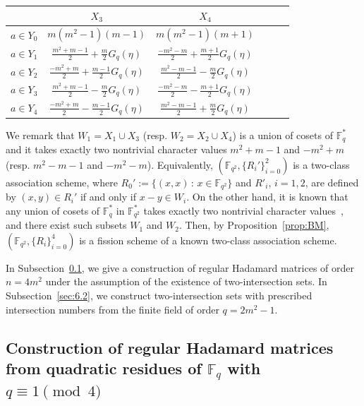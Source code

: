 \documentclass[ALCO,ThmDefs,Unicode]{cedram}
\newcommand*\F{{\mathbb F}}
\begin{document}
\begin{theo}
\begin{table}[!h]
\begin{center}
\begin{tabular}{|c||c|c|c|c|c|}
\end{tabular}\vspace{0.5em}
\begin{tabular}{|c||c|c|c|c|c|}\hline
&$X_3$&$X_4$\\ \hline \hline $a\in Y_0$& $m(m^2-1)(m-1)$ & $m(m^2-1)(m+1)$\\\hline $a\in Y_{1}$& $\frac{m^2+m-1}{2}+\frac{m}{2}G_q(\eta)$ & $\frac{-m^2-m}{2}+\frac{m+1}{2}G_q(\eta)$\\\hline $a\in Y_2$& $\frac{-m^2+m}{2}+\frac{m-1}{2}G_q(\eta)$& $\frac{m^2-m-1}{2}-\frac{m}{2}G_q(\eta)$\\\hline $a\in Y_{3}$& $\frac{m^2+m-1}{2}-\frac{m}{2}G_q(\eta)$ & $\frac{-m^2-m}{2}-\frac{m+1}{2}G_q(\eta)$\\\hline $a\in Y_4$& $\frac{-m^2+m}{2}-\frac{m-1}{2}G_q(\eta)$ & $\frac{m^2-m-1}{2}+\frac{m}{2}G_q(\eta)$\\\hline
\end{tabular}
\end{center}
\end{table}
\end{theo}

\begin{rema}
We remark that $W_1=X_1\cup X_3$ (resp. $W_2=X_2\cup X_4$) is a union of cosets of $\F_{q}^\ast$ and it takes exactly two nontrivial character values $m^2+m-1$ and $-m^2+m$ (resp. $m^2-m-1$ and $-m^2-m$). Equivalently, $(\F_{q^2},\{R_i'\}_{i=0}^2)$ is a two-class association scheme, where $R_0':=\{(x,x)\,:\,x\in \F_{q^2}\}$ and $R'_i$, $i=1,2$, are defined by $(x,y)\in R_{i}'$ if and only if $x-y\in W_i$. On the other hand, it is known that any union of cosets of $\F_{q}^\ast$ in $\F_{q^2}^\ast$ takes exactly two nontrivial character values~\cite[Theorem~2]{BWX}, and there exist such subsets $W_1$ and $W_2$. Then, by Proposition~\ref{prop:BM}, $(\F_{q^2},\{R_i\}_{i=0}^4)$ is a fission scheme of a known two-class association scheme.
\end{rema}

In Subsection~\ref{sec:6.1}, we give a construction of regular Hadamard matrices of order $n=4m^2$ under the assumption of the existence of two-intersection sets. In Subsection~\ref{sec:6.2}, we construct two-intersection sets with prescribed intersection numbers from the finite field of order $q=2m^2-1$.

\subsection{Construction of regular Hadamard matrices from quadratic residues of \texorpdfstring{$\F_q$}{Fq} with \texorpdfstring{$q\equiv 1\pmod{4}$}{q = 1 (mod 4)}}\label{sec:6.1}
\end{document}
